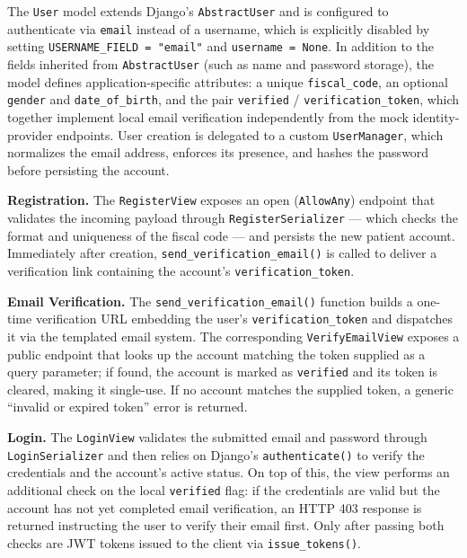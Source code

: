 The \texttt{User} model extends Django's \texttt{AbstractUser} and is configured to authenticate via \texttt{email} instead of a username, which is explicitly disabled by setting \texttt{USERNAME\_FIELD = "email"} and \texttt{username = None}. In addition to the fields inherited from \texttt{AbstractUser} (such as name and password storage), the model defines application-specific attributes: a unique \texttt{fiscal\_code}, an optional \texttt{gender} and \texttt{date\_of\_birth}, and the pair \texttt{verified} / \texttt{verification\_token}, which together implement local email verification independently from the mock identity-provider endpoints. User creation is delegated to a custom \texttt{UserManager}, which normalizes the email address, enforces its presence, and hashes the password before persisting the account.

\vspace{0.2cm}
\noindent\textbf{Registration.} The \texttt{RegisterView} exposes an open (\texttt{AllowAny}) endpoint that validates the incoming payload through \texttt{RegisterSerializer} --- which checks the format and uniqueness of the fiscal code --- and persists the new patient account. Immediately after creation, \texttt{send\_verification\_email()} is called to deliver a verification link containing the account's \texttt{verification\_token}.

\vspace{0.2cm}
\noindent\textbf{Email Verification.} The \texttt{send\_verification\_email()} function builds a one-time verification URL embedding the user's \texttt{verification\_token} and dispatches it via the templated email system. The corresponding \texttt{VerifyEmailView} exposes a public endpoint that looks up the account matching the token supplied as a query parameter; if found, the account is marked as \texttt{verified} and its token is cleared, making it single-use. If no account matches the supplied token, a generic ``invalid or expired token'' error is returned.

\vspace{0.2cm}
\noindent\textbf{Login.} The \texttt{LoginView} validates the submitted email and password through \texttt{LoginSerializer} and then relies on Django's \texttt{authenticate()} to verify the credentials and the account's active status. On top of this, the view performs an additional check on the local \texttt{verified} flag: if the credentials are valid but the account has not yet completed email verification, an HTTP 403 response is returned instructing the user to verify their email first. Only after passing both checks are JWT tokens issued to the client via \texttt{issue\_tokens()}.

